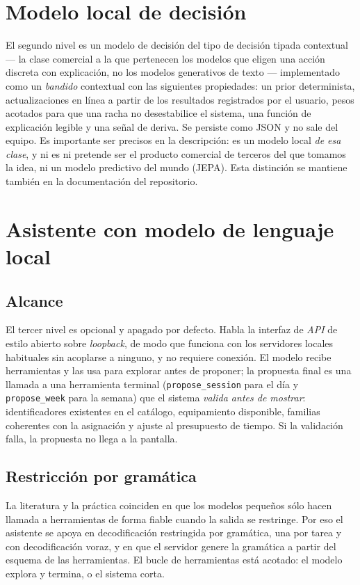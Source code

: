 \documentclass[conference]{IEEEtran}
\newcommand{\code}[1]{\texttt{\small #1}}
\begin{document}
\section{Modelo local de decisi\'on}
El segundo nivel es un modelo de decisi\'on del tipo de decisi\'on tipada
contextual --- la clase comercial a la que pertenecen los modelos que eligen una
acci\'on discreta con explicaci\'on, no los modelos generativos de texto ---
implementado como un \emph{bandido} contextual con las siguientes propiedades:
un prior determinista, actualizaciones en l\'inea a partir de los resultados
registrados por el usuario, pesos acotados para que una racha no desestabilice
el sistema, una funci\'on de explicaci\'on legible y una se\~nal de deriva. Se
persiste como JSON y no sale del equipo. Es importante ser precisos en la
descripci\'on: es un modelo local \emph{de esa clase}, y ni es ni pretende ser
el producto comercial de terceros del que tomamos la idea, ni un modelo
predictivo del mundo (JEPA). Esta distinci\'on se mantiene tambi\'en en la
documentaci\'on del repositorio.

\section{Asistente con modelo de lenguaje local}

\subsection{Alcance}
El tercer nivel es opcional y apagado por defecto. Habla la interfaz de
\emph{API} de estilo abierto sobre \emph{loopback}, de modo que funciona con los
servidores locales habituales sin acoplarse a ninguno, y no requiere conexi\'on.
El modelo recibe herramientas y las usa para explorar antes de proponer; la
propuesta final es una llamada a una herramienta terminal
(\code{propose\_session} para el d\'ia y \code{propose\_week} para la semana)
que el sistema \emph{valida antes de mostrar}: identificadores existentes en el
cat\'alogo, equipamiento disponible, familias coherentes con la asignaci\'on y
ajuste al presupuesto de tiempo. Si la validaci\'on falla, la propuesta no llega
a la pantalla.

\subsection{Restricci\'on por gram\'atica}
La literatura y la pr\'actica coinciden en que los modelos peque\~nos s\'olo
hacen llamada a herramientas de forma fiable cuando la salida se restringe. Por
eso el asistente se apoya en decodificaci\'on restringida por gram\'atica, una
por tarea y con decodificaci\'on voraz, y en que el servidor genere la
gram\'atica a partir del esquema de las herramientas. El bucle de herramientas
est\'a acotado: el modelo explora y termina, o el sistema corta.
\end{document}
